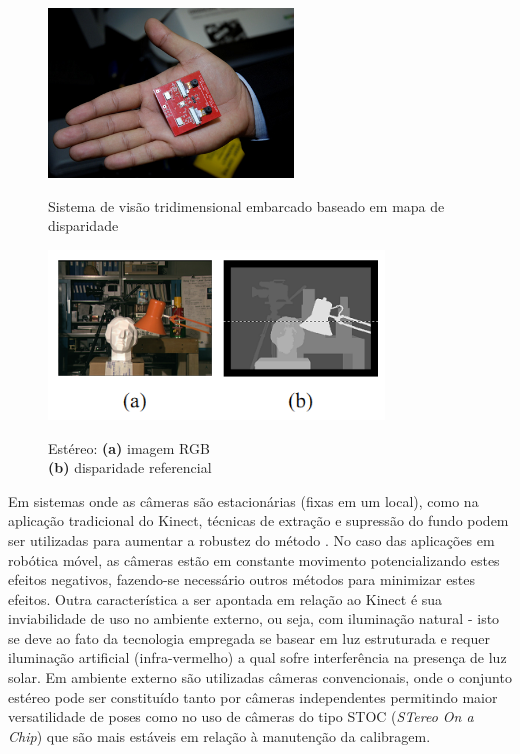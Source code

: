 \vspace{0.5cm}
\begin{figure}[h!!!]
	\centering
	\begin{minipage}[b]{0.4\linewidth}
	    \centering
	    \includegraphics[width=\textwidth,height=4.5cm]{images/stoc_on_chip.png}
	 	\caption{Sistema de visão tridimensional
embarcado baseado em mapa de disparidade}
	 	\label{fig:stoc_on_chip}
	\end{minipage}
	\hspace{0.1cm}
	\begin{minipage}[b]{0.55\linewidth}
	    \centering
	 	\includegraphics[width=\textwidth,height=4.5cm]{images/tsukuba.png}
	 	\caption{Estéreo: \textbf{(a)} imagem RGB \\ \textbf{(b)} disparidade referencial}
	 	\label{fig:tsukuba}
	\end{minipage}
\end{figure}


Em sistemas onde as câmeras são estacionárias (fixas em um local), como na
aplicação tradicional do Kinect, técnicas de extração e supressão do fundo podem
ser utilizadas para aumentar a robustez do método \cite{Ivanov2000}. No caso das
aplicações em robótica móvel, as câmeras estão em constante movimento
potencializando estes efeitos negativos, fazendo-se necessário outros métodos
para minimizar estes efeitos. Outra característica a ser apontada em relação ao
Kinect é sua inviabilidade de uso no ambiente externo, ou seja, com iluminação
natural - isto se deve ao fato da tecnologia empregada se basear em luz
estruturada e requer iluminação artificial (infra-vermelho) a qual sofre
interferência na presença de luz solar. Em ambiente externo são utilizadas
câmeras convencionais, onde o conjunto estéreo pode ser constituído tanto por
câmeras independentes permitindo maior versatilidade de poses como no uso de
câmeras do tipo STOC (\textit{STereo On a Chip}) que são mais estáveis em
relação à manutenção da calibragem.

